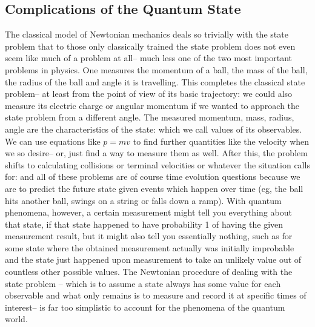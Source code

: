 \subsection{Complications of the Quantum State} 
The classical model of Newtonian mechanics deals so trivially with the state problem that to those only classically trained the state problem does not even seem like much of a problem at all-- much less one of the two most important problems in physics. One measures the momentum of a ball, the mass of the ball, the radius of the ball and angle it is travelling. This completes the classical state problem-- at least from the point of view of its basic trajectory: we could also measure its electric charge or angular momentum if we wanted to approach the state problem from a different angle. The measured momentum, mass, radius, angle are the characteristics of the state: which we call values of its observables. We can use equations like $p=mv$ to find further quantities like the velocity when we so desire-- or, just find a way to measure them as well. After this, the problem shifts to calculating collisions or terminal velocities or whatever the situation calls for: and all of these problems are of course time evolution questions because we are to predict the future state given events which happen over time (eg, the ball hits another ball, swings on a string or falls down a ramp). With quantum phenomena, however, a certain measurement might tell you everything about that state, if that state happened to have probability 1 of having the given measurement result, but it might also tell you essentially nothing, such as for some state where the obtained measurement actually was initially improbable and the state just happened upon measurement to take an unlikely value out of countless other possible values. The Newtonian procedure of dealing with the state problem -- which is to assume a state always has some value for each observable and what only remains is to measure and record it at specific times of interest-- is far too simplistic to account for the phenomena of the quantum world.
\\\\
